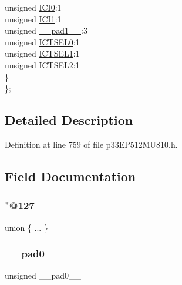 \begin{DoxyCompactItemize}
\begin{tabbing}
\>\>unsigned \hyperlink{structtag_i_c5_c_o_n1_b_i_t_s_a6f1b5da2706b7c15fc8c9a01a30deaff}{ICI0}:1\\
\>\>unsigned \hyperlink{structtag_i_c5_c_o_n1_b_i_t_s_a7d5c777f0bc43f66f40462f79ed2179c}{ICI1}:1\\
\>\>unsigned \hyperlink{structtag_i_c5_c_o_n1_b_i_t_s_acaf2d0924a107ec6e8d2e31febaf66f9}{\_\_pad1\_\_}:3\\
\>\>unsigned \hyperlink{structtag_i_c5_c_o_n1_b_i_t_s_af6dd4d0e816b18462680d4b22fa926d3}{ICTSEL0}:1\\
\>\>unsigned \hyperlink{structtag_i_c5_c_o_n1_b_i_t_s_aa29140e739d886362537f87d199c4134}{ICTSEL1}:1\\
\>\>unsigned \hyperlink{structtag_i_c5_c_o_n1_b_i_t_s_a47d80892d449e6edbd5ba2ba9ff06deb}{ICTSEL2}:1\\
\>\} \\
\}; \\

\end{tabbing}\end{DoxyCompactItemize}


\subsection{Detailed Description}


Definition at line 759 of file p33\+E\+P512\+M\+U810.\+h.



\subsection{Field Documentation}
\mbox{\label{structtag_i_c5_c_o_n1_b_i_t_s_a5ab02df0ca20c58c2f07d1ddc3a99af8}} 
\subsubsection{\texorpdfstring{"@127}{@127}}
{\footnotesize\ttfamily union \{ ... \} }

\mbox{\label{structtag_i_c5_c_o_n1_b_i_t_s_adf71f3d8410c1f1dbbc96680a92c49af}} 
\subsubsection{\texorpdfstring{\+\_\+\+\_\+pad0\+\_\+\+\_\+}{\_\_pad0\_\_}}
{\footnotesize\ttfamily unsigned \+\_\+\+\_\+pad0\+\_\+\+\_\+}



